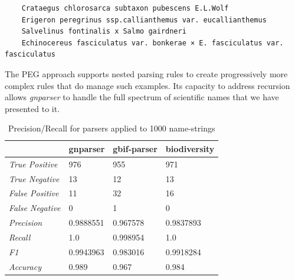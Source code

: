 \documentclass{bmcart}
\begin{document}
\vspace{0.5cm}

\begin{verbatim}
    Crataegus chlorosarca subtaxon pubescens E.L.Wolf
    Erigeron peregrinus ssp.callianthemus var. eucallianthemus
    Salvelinus fontinalis x Salmo gairdneri
    Echinocereus fasciculatus var. bonkerae × E. fasciculatus var. fasciculatus
\end{verbatim}

\vspace{0.5cm}

The PEG approach supports nested parsing rules to create progressively more complex rules that do manage such examples. Its capacity to address recursion allows \textit{gnparser} to handle the full spectrum of scientific names that we have presented to it.

\begin{table}[htb]
  \begin{center}
    \caption{Precision/Recall for parsers applied to 1000
    name-strings}\label{table:precision}
    \resizebox{10cm}{!} {\begin{tabular}{|l|*{3}{l}|}
      \hline
                             & gnparser & gbif-parser & biodiversity \\
      \hline
      \textit{True Positive} & 976      & 955         & 971          \\
      \textit{True Negative} & 13       & 12          & 13           \\
      \textit{False Positive}& 11       & 32          & 16           \\
      \textit{False Negative}& 0        & 1           & 0            \\
      \textit{Precision}     & 0.9888551& 0.967578    & 0.9837893    \\
      \textit{Recall}        & 1.0      & 0.998954    & 1.0          \\
      \textit{F1}            & 0.9943963& 0.983016    & 0.9918284    \\
      \textit{Accuracy}      & 0.989    & 0.967       & 0.984        \\
      \hline
    \end{tabular}
    }
  \end{center}
\end{table}
\end{document}
